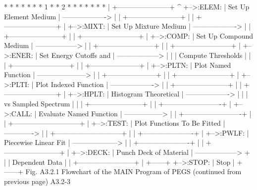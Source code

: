 \newpage {} 
\begin{center}
\begin{boxedverbatim}
   *                                                         *
  * *                                                       * *
 * 1 *                                                     * 2 *
  * *                                                       * *
   *                                                         *
   |          +-----------------------+                      ^
   +-->:ELEM: | Set Up Element Medium | -------------------> |
   |          +-----------------------+                      |
   |          +-----------------------+                      |
   +-->:MIXT: | Set Up Mixture Medium | -------------------> |
   |          +-----------------------+                      |
   |          +------------------------+                     |
   +-->:COMP: | Set Up Compound Medium | ------------------> |
   |          +------------------------+                     |
   |          +------------------------+                     |
   +-->:ENER: | Set Energy Cutoffs and | ------------------> |
   |          | Compute Thresholds     |                     |
   |          +------------------------+                     |
   |          +---------------------+                        |
   +-->:PLTN: | Plot Named Function | ---------------------> |
   |          +---------------------+                        |
   |          +-----------------------+                      |
   +-->:PLTI: | Plot Indexed Function | -------------------> |
   |          +-----------------------+                      |
   |          +-----------------------+                      |
   +-->:HPLT: | Histogram Theoretical | -------------------> |
   |          |  vs Sampled Spectrum  |                      |
   |          +-----------------------+                      |
   |          +-------------------------+                    |
   +-->:CALL: | Evaluate Named Function | -----------------> |
   |          +-------------------------+                    |
   |          +-----------------------------+                |
   +-->:TEST: | Plot Functions To Be Fitted | -------------> |
   |          +-----------------------------+                |
   |          +----------------------+                       |
   +-->:PWLF: | Piecewise Linear Fit | --------------------> |
   |          +----------------------+                       |
   |          +------------------------+                     |
   +-->:DECK: | Punch Deck of Material | ------------------> +
   |          | Dependent Data         |
   |          +------------------------+
   |          +------+
   +-->:STOP: | Stop |
              +------+
      Fig. A3.2.1  Flowchart of the MAIN Program of PEGS
                     (continued from previous page)
 A3.2-3
\end{boxedverbatim} 
\end{center}
